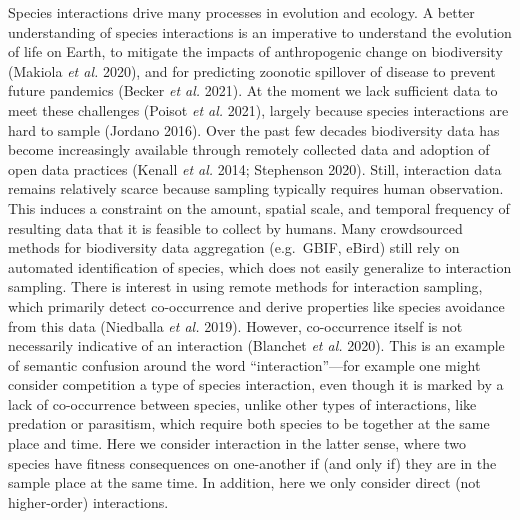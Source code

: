 \documentclass[10pt,oneside]{article}
\begin{document}
Species interactions drive many processes in evolution and ecology. A
better understanding of species interactions is an imperative to
understand the evolution of life on Earth, to mitigate the impacts of
anthropogenic change on biodiversity (Makiola \emph{et al.} 2020), and
for predicting zoonotic spillover of disease to prevent future pandemics
(Becker \emph{et al.} 2021). At the moment we lack sufficient data to
meet these challenges (Poisot \emph{et al.} 2021), largely because
species interactions are hard to sample (Jordano 2016). Over the past
few decades biodiversity data has become increasingly available through
remotely collected data and adoption of open data practices (Kenall
\emph{et al.} 2014; Stephenson 2020). Still, interaction data remains
relatively scarce because sampling typically requires human observation.
This induces a constraint on the amount, spatial scale, and temporal
frequency of resulting data that it is feasible to collect by humans.
Many crowdsourced methods for biodiversity data aggregation (e.g.~GBIF,
eBird) still rely on automated identification of species, which does not
easily generalize to interaction sampling. There is interest in using
remote methods for interaction sampling, which primarily detect
co-occurrence and derive properties like species avoidance from this
data (Niedballa \emph{et al.} 2019). However, co-occurrence itself is
not necessarily indicative of an interaction (Blanchet \emph{et al.}
2020). This is an example of semantic confusion around the word
``interaction''---for example one might consider competition a type of
species interaction, even though it is marked by a lack of co-occurrence
between species, unlike other types of interactions, like predation or
parasitism, which require both species to be together at the same place
and time. Here we consider interaction in the latter sense, where two
species have fitness consequences on one-another if (and only if) they
are in the sample place at the same time. In addition, here we only
consider direct (not higher-order) interactions.
\end{document}
